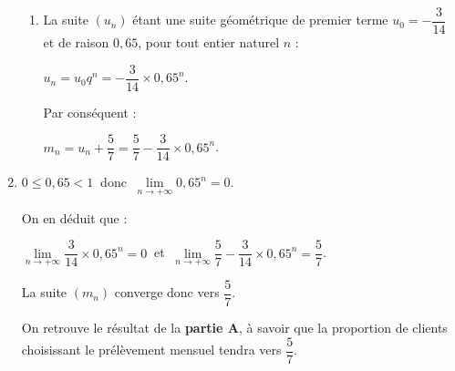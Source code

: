 \begin{corrige}
\begin{enumerate}
\begin{enumerate}[label=\alph*.]
          \item %
          La suite $(u_n)$ étant une suite géométrique de premier terme ${u_0=-\dfrac{3}{14}}$ et de raison $0,65$, pour tout entier naturel $n$ :
          \par
          $u_n=u_0q^n=-\dfrac{3}{14} \times 0,65^n$.
          \par
          Par conséquent :
          \par
          $m_{n}= u_n + \dfrac{5}{7}=\dfrac{5}{7}-\dfrac{3}{14} \times 0,65^n$.
          \par
     \end{enumerate}
     \item %
     ${0 \leqslant 0,65 < 1}\ $ donc $\ \lim\limits_{n \rightarrow +\infty } 0,65^n = 0$.
     \par
     On en déduit que :
     \par
     $\lim\limits_{n \rightarrow +\infty}\dfrac{3}{14} \times 0,65^n = 0\ $ et $\ \lim\limits_{n \rightarrow +\infty}\dfrac{5}{7}-\dfrac{3}{14} \times 0,65^n = \dfrac{5}{7}$.
     \par
     La suite $(m_n)$ converge donc vers $\dfrac{5}{7}$.
     \par
     On retrouve le résultat de la \textbf{partie A}, à savoir que la proportion de clients choisissant le prélèvement mensuel tendra vers $\dfrac{5}{7}$.
\end{enumerate}
\end{corrige}
